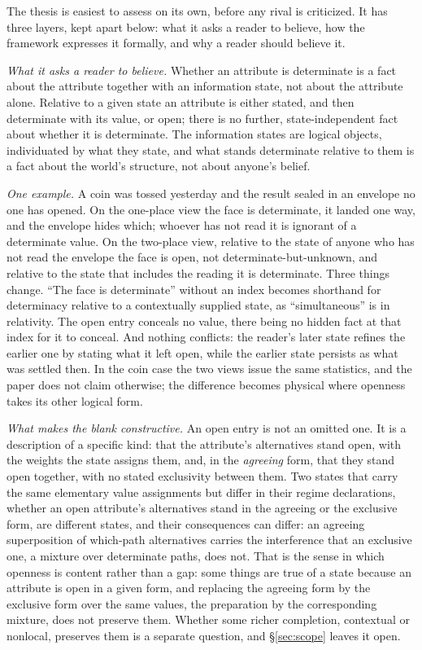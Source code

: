 \noindent The thesis is easiest to assess on its own, before any rival is criticized. It has three layers, kept apart below: what it asks a reader to believe, how the framework expresses it formally, and why a reader should believe it.

\textit{What it asks a reader to believe.} Whether an attribute is determinate is a fact about the attribute together with an information state, not about the attribute alone. Relative to a given state an attribute is either stated, and then determinate with its value, or open; there is no further, state-independent fact about whether it is determinate. The information states are logical objects, individuated by what they state, and what stands determinate relative to them is a fact about the world's structure, not about anyone's belief.

\textit{One example.} A coin was tossed yesterday and the result sealed in an envelope no one has opened. On the one-place view the face is determinate, it landed one way, and the envelope hides which; whoever has not read it is ignorant of a determinate value. On the two-place view, relative to the state of anyone who has not read the envelope the face is open, not determinate-but-unknown, and relative to the state that includes the reading it is determinate. Three things change. ``The face is determinate'' without an index becomes shorthand for determinacy relative to a contextually supplied state, as ``simultaneous'' is in relativity. The open entry conceals no value, there being no hidden fact at that index for it to conceal. And nothing conflicts: the reader's later state refines the earlier one by stating what it left open, while the earlier state persists as what was settled then. In the coin case the two views issue the same statistics, and the paper does not claim otherwise; the difference becomes physical where openness takes its other logical form.

\textit{What makes the blank constructive.} An open entry is not an omitted one. It is a description of a specific kind: that the attribute's alternatives stand open, with the weights the state assigns them, and, in the \emph{agreeing} form, that they stand open together, with no stated exclusivity between them. Two states that carry the same elementary value assignments but differ in their regime declarations, whether an open attribute's alternatives stand in the agreeing or the exclusive form, are different states, and their consequences can differ: an agreeing superposition of which-path alternatives carries the interference that an exclusive one, a mixture over determinate paths, does not. That is the sense in which openness is content rather than a gap: some things are true of a state because an attribute is open in a given form, and replacing the agreeing form by the exclusive form over the same values, the preparation by the corresponding mixture, does not preserve them. Whether some richer completion, contextual or nonlocal, preserves them is a separate question, and \S\ref{sec:scope} leaves it open.

